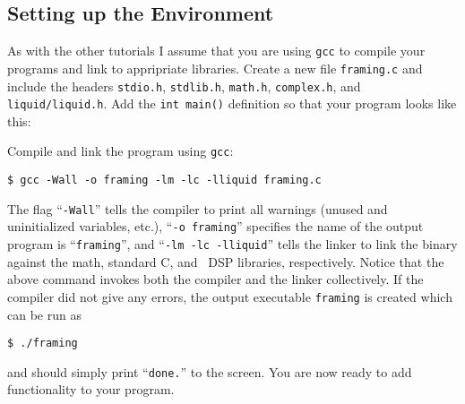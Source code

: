 %
%
\subsection{Setting up the Environment}
\label{tutorial:framing:environment}

As with the other tutorials I assume that you are using {\tt gcc} to
compile your programs and link to appripriate libraries.
Create a new file {\tt framing.c} and include the headers
{\tt stdio.h},
{\tt stdlib.h},
{\tt math.h},
{\tt complex.h}, and
{\tt liquid/liquid.h}.
Add the {\tt int main()} definition so that your program looks like
this:
%

%
Compile and link the program using {\tt gcc}:
%
\begin{Verbatim}[fontsize=\small]
    $ gcc -Wall -o framing -lm -lc -lliquid framing.c
\end{Verbatim}
%
The flag ``{\tt -Wall}'' tells the compiler to print all warnings
(unused and uninitialized variables, etc.),
``{\tt -o framing}'' specifies the name of the output program is
``{\tt framing}'', and
``{\tt -lm -lc -lliquid}'' tells the linker to link the binary against
the math, standard C, and \liquid\ DSP libraries, respectively.
Notice that the above command invokes both the compiler and the linker
collectively.
%
If the compiler did not give any errors, the output executable
{\tt framing} is created which can be run as
%
\begin{Verbatim}[fontsize=\small]
    $ ./framing
\end{Verbatim}
%
and should simply print ``{\tt done.}'' to the screen.
You are now ready to add functionality to your program.



%
%
